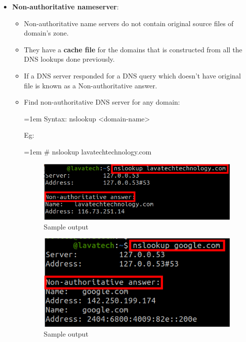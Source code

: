 \begin{flushleft}
\begin{itemize}
\begin{itemize}
		\end{itemize}
		
		\newpage
		\item \textbf{Non-authoritative nameserver}:
		\begin{itemize}
			\item Non-authoritative name servers do not contain original source files of domain’s zone. 
			\item They have a \textbf{cache file} for the domains that is constructed from all the DNS lookups done previously. 
			\item If a DNS server responded for a DNS query which doesn’t have original file is known as a Non-authoritative answer.
			\item Find non-authoritative DNS server for any domain:
			\begin{tcolorbox}[breakable,notitle,boxrule=0pt,colback=pink,colframe=pink]
				\color{black}
				\font=1em
				Syntax: nslookup <domain-name>
				\font=4pt
			\end{tcolorbox}
			Eg:
			\begin{tcolorbox}[breakable,notitle,boxrule=-0pt,colback=black,colframe=black]
				\color{green}
				\font=1em
				\# nslookup lavatechtechnology.com
				\font=4pt
			\end{tcolorbox}
			
			\begin{figure}[h!]
				\centering
				\includegraphics[scale=.5]{content/chapter3/images/ns1.png}
				\caption{Sample output}
				\label{fig:dns_heir4}
			\end{figure}			

			\begin{figure}[h!]
				\centering
				\includegraphics[scale=.6]{content/chapter3/images/ns2.png}
				\caption{Sample output}
				\label{fig:dns_heir5}
			\end{figure}			
			

\end{itemize}
\end{itemize}
\end{flushleft}

